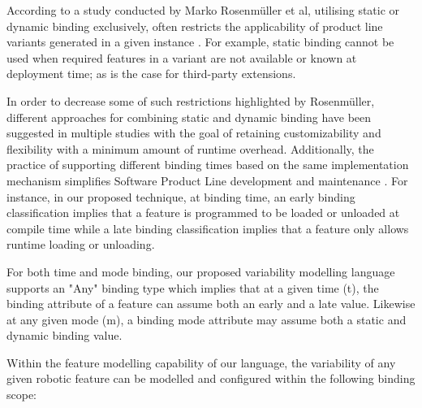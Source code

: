 \documentclass[conference]{IEEEtran}
\begin{document}
According to a study conducted by Marko Rosenmüller et al, utilising static or dynamic binding exclusively, often restricts the applicability of product line variants generated in a given instance \cite{flex-feat-bind}. For example, static binding cannot be used when required features in a variant are not available or known at deployment time; as is the case for third-party extensions. 

In order to decrease some of such restrictions highlighted by Rosenmüller, different approaches for combining static and dynamic binding have been suggested in multiple studies with the goal of retaining customizability and flexibility with a minimum amount of runtime overhead. Additionally, the practice of supporting different binding times based on the same implementation mechanism simplifies Software Product Line development and maintenance \cite{flex-feat-bind}. For instance, in our proposed technique, at binding time, an early binding classification implies that a feature is programmed to be loaded or unloaded at compile time while a late binding classification implies that a feature only allows runtime loading or unloading.

For both time and mode binding, our proposed variability modelling language supports an "Any" binding type which implies that at a given time (t), the binding attribute of a feature can assume both an early and a late value. Likewise at any given mode (m), a binding mode attribute may assume both a static and dynamic binding value.

Within the feature modelling capability of our language, the variability of any given robotic feature can be modelled and configured within the following binding scope:
\end{document}

